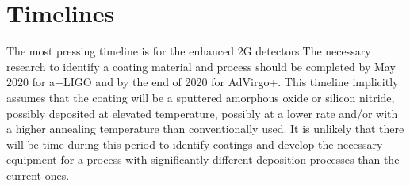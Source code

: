 \section{Timelines}

The most pressing timeline is for the enhanced \ac{2G} detectors.The necessary research to identify a coating material and process should be completed by May 2020 for \ac{a+LIGO} and by the end of 2020 for \ac{AdVirgo+}. This timeline implicitly assumes that the coating will be a sputtered amorphous oxide or silicon nitride, possibly deposited at elevated temperature, possibly at a lower rate and/or with a higher annealing temperature than conventionally used. It is unlikely that there will be time during this period to identify coatings and develop the necessary equipment for a process with significantly different deposition processes than the current ones.


